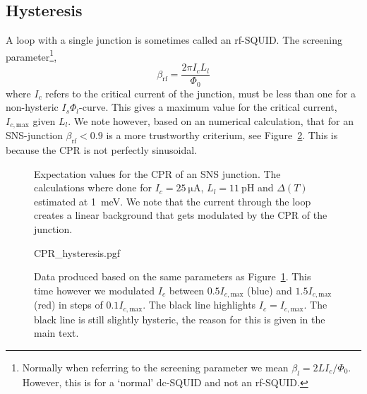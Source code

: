 \subsection{Hysteresis}
A loop with a single junction is sometimes called an rf-SQUID\cite{clarkeSQUIDHandbook2004}. The screening parameter\footnote{Normally when referring to the screening parameter we mean $\beta_l = 2LI_c/\Phi_0$. However, this is for a `normal' dc-SQUID and not an rf-SQUID.},
\begin{equation}
	\beta_{\text{rf}} = \frac{2\pi I_c L_l}{\Phi_0}
\end{equation}
where $I_c$ refers to the critical current of the junction, must be less than one for a non-hysteric $I_s\Phi_l$-curve\cite{clarkeSQUIDHandbook2004,frolovMeasurementCurrentPhaseRelation2004}. This gives a maximum value for the critical current, $I_{c,\text{max}}$ given $L_l$. We note however, based on an numerical calculation, that for an SNS-junction $\beta_{\text{rf}} < 0.9$ is a more trustworthy criterium, see Figure~\ref{fig:CPR-hysteresis}. This is because the CPR is not perfectly sinusoidal\cite{vermeerSTMbasedScanningSQUID2021,likharevSuperconductingWeakLinks1979}.

\begin{figure}[ht]
	\begin{subfigure}[t]{0.45\textwidth}
		\centering
		
	\end{subfigure}
	\hfill
	\begin{subfigure}[t]{0.45\textwidth}
		\centering
		
	\end{subfigure}

	\caption{Expectation values for the CPR of an SNS junction. The calculations where done for $I_c=\qty{25}{\micro\ampere}$, $L_l=\qty{11}{\pico\henry}$ and $\Delta(T)$ estimated at \qty{1}{\milli\electronvolt}. We note that the current through the loop creates a linear background that gets modulated by the CPR of the junction.}
	\label{fig:analytical-prediction}
\end{figure}

\begin{figure}
	\centering
	{CPR_hysteresis.pgf}
	\caption{Data produced based on the same parameters as Figure~\ref{fig:analytical-prediction}. This time however we modulated $I_c$ between $0.5I_{c,\text{max}}$ (blue) and $1.5I_{c,\text{max}}$ (red) in steps of $0.1I_{c,\text{max}}$. The black line highlights $I_c=I_{c,\text{max}}$. The black line is still slightly hysteric, the reason for this is given in the main text.}
	\label{fig:CPR-hysteresis}
\end{figure}